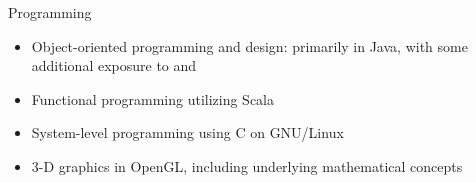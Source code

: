 \cvitem
    {Programming}
    {\begin{itemize}
        \item Object-oriented programming and design: primarily in Java, with some additional
exposure to \csharp and \cpp
        \item Functional programming utilizing Scala
        \item System-level programming using C on GNU/Linux
        \item 3-D graphics in OpenGL, including underlying mathematical concepts
    \end{itemize}}
    \vspace*{-\baselineskip}